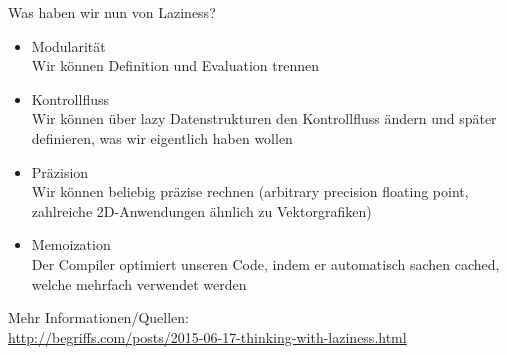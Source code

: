 \documentclass{beamer}
\begin{document}
\begin{frame}[fragile]
Was haben wir nun von Laziness?\pause
\begin{itemize}
 \item Modularität\\\pause
       Wir können Definition und Evaluation trennen
 \pause
 \item Kontrollfluss\\\pause
       Wir können über lazy Datenstrukturen den Kontrollfluss ändern und später definieren, was wir eigentlich haben wollen
 \pause
 \item Präzision\\\pause
       Wir können beliebig präzise rechnen (arbitrary precision floating point, zahlreiche 2D-Anwendungen ähnlich zu Vektorgrafiken)
 \pause
 \item Memoization\\\pause
       Der Compiler optimiert unseren Code, indem er automatisch sachen cached, welche mehrfach verwendet werden
\end{itemize}
\pause
Mehr Informationen/Quellen:\\
\url{http://begriffs.com/posts/2015-06-17-thinking-with-laziness.html}
\end{frame}
\end{document}

